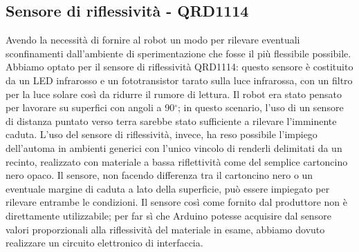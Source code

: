 \subsection{Sensore di riflessività - QRD1114}
Avendo la necessità di fornire al robot un modo per rilevare eventuali 
sconfinamenti dall'ambiente di sperimentazione che fosse il più flessibile possibile. 
Abbiamo optato per il sensore di riflessività QRD1114: questo sensore è costituito da un LED infrarosso e un 
fototransistor tarato sulla luce infrarossa, con un filtro per la luce solare 
così da ridurre il rumore di lettura. Il robot era stato pensato per lavorare 
su superfici con angoli a 90$^\circ$; in questo scenario, l'uso di un sensore 
di distanza puntato verso terra sarebbe stato sufficiente a rilevare l'imminente caduta. 
L'uso del sensore di riflessività, invece, ha reso possibile l'impiego dell'automa in ambienti 
generici con l'unico vincolo di renderli delimitati da un recinto, 
realizzato con materiale a bassa riflettività come del semplice cartoncino nero opaco.
Il sensore, non facendo differenza tra il cartoncino nero o un eventuale margine 
di caduta a lato della superficie, può essere impiegato per rilevare entrambe le condizioni.
Il sensore così come fornito dal produttore non è direttamente 
utilizzabile; per far sì che Arduino potesse acquisire dal sensore valori 
proporzionali alla riflessività del materiale in esame, abbiamo dovuto 
realizzare un circuito elettronico di interfaccia. 
